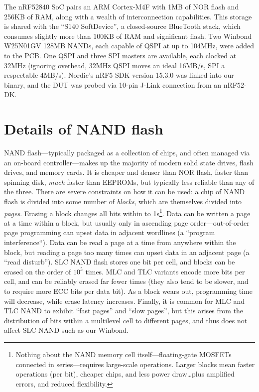 \documentclass[letterpaper,10pt]{article}
\begin{document}
The nRF52840\parencite{nrf52840} SoC pairs an ARM Cortex-M4F with 1MB of
NOR flash and 256KB of RAM, along with a wealth of interconnection
capabilities. This storage is shared with the ``S140
SoftDevice''\parencite{s140}, a closed-source BlueTooth stack, which consumes
slightly more than 100KB of RAM and significant flash.
Two Winbond W25N01GV\parencite{winbond}
128MB NANDs, each capable of QSPI at up to 104MHz, were added to the PCB.
One QSPI and three SPI masters are available, each clocked at 32MHz (ignoring
overhead, 32MHz QSPI moves an ideal 16MB/s, SPI a respectable 4MB/s). Nordic's nRF5 SDK\parencite{nrf52sdk}
version 15.3.0 was linked into our binary, and the DUT was probed via 10-pin
J-Link\parencite{segger} connection from an nRF52-DK\parencite{nrf52dk}.

\section{Details of NAND flash}

NAND flash---typically packaged as a collection of chips, and often managed via
an on-board controller---makes up the majority of modern solid state drives,
flash drives, and memory cards. It is cheaper and denser than NOR flash,
faster than spinning disk, \textit{much} faster than EEPROMs, but typically
less reliable than any of the three. There are severe constraints on how it can be
used: a chip of NAND flash is divided into some number of \textit{blocks}, which are
themselves divided into \textit{pages}. Erasing a block changes all bits within to
1s\footnote{Nothing about the NAND memory cell itself---floating-gate MOSFETs
connected in series---requires large-scale operations. Larger blocks mean
faster operations (per bit), cheaper chips, and less power draw\ldots plus
amplified errors, and reduced flexibility.}. Data can be written a page at a
time within a block, but usually only in ascending page order---out-of-order
page programming can upset data in adjacent wordlines (a ``program
interference``\parencite{interference}). Data can be read a page at a time from
anywhere within the block, but reading a page too many times can upset data in
an adjacent page (a ``read disturb''\parencite{readdisturb}). SLC NAND flash stores one bit per cell,
and blocks can be erased on the order of $10^5$ times. MLC and TLC variants
encode more bits per cell, and can be reliably erased far fewer times (they
also tend to be slower, and to require more ECC bits per data bit). As a block
wears out, programming time will decrease, while erase latency
increases\parencite{needtoknow}. Finally, it is common for MLC and TLC NAND to
exhibit ``fast pages'' and ``slow pages'', but this arises from the
distribution of bits within a multilevel cell to different pages, and thus does
not affect SLC NAND\parencite{anomalies} such as our Winbond.
\end{document}
